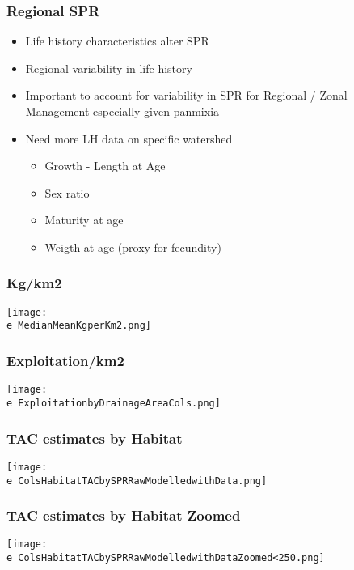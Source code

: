\documentclass{beamer}
\newcommand{\e}{/SpinDr/backup/bio_data/bio.eels/figures/}
\begin{document}
\begin{frame}
	\frametitle{Regional SPR}
	\begin{itemize}
		\item Life history characteristics alter SPR
		\item Regional variability in life history 
		\item Important to account for variability in SPR for Regional / Zonal Management especially given panmixia
		\item Need more LH data on specific watershed
		\begin{itemize}
			\item Growth - Length at Age
			\item Sex ratio 
			\item Maturity at age
			\item Weigth at age (proxy for fecundity)
		\end{itemize}
		\end{itemize}
\end{frame}


\begin{frame}
	\frametitle{Kg/km2}
	\centering
	  \texttt{[image: \\e MedianMeanKgperKm2.png]}
   \end{frame}

\begin{frame}
	\frametitle{Exploitation/km2}
	\centering
	  \texttt{[image: \\e ExploitationbyDrainageAreaCols.png]}
   \end{frame}


\begin{frame}
	\frametitle{TAC estimates by Habitat }
	\centering
	  \texttt{[image: \\e ColsHabitatTACbySPRRawModelledwithData.png]}
   \end{frame}


\begin{frame}
	\frametitle{TAC estimates by Habitat Zoomed}
	\centering
	  \texttt{[image: \\e ColsHabitatTACbySPRRawModelledwithDataZoomed<250.png]}
   \end{frame}
\end{document}
